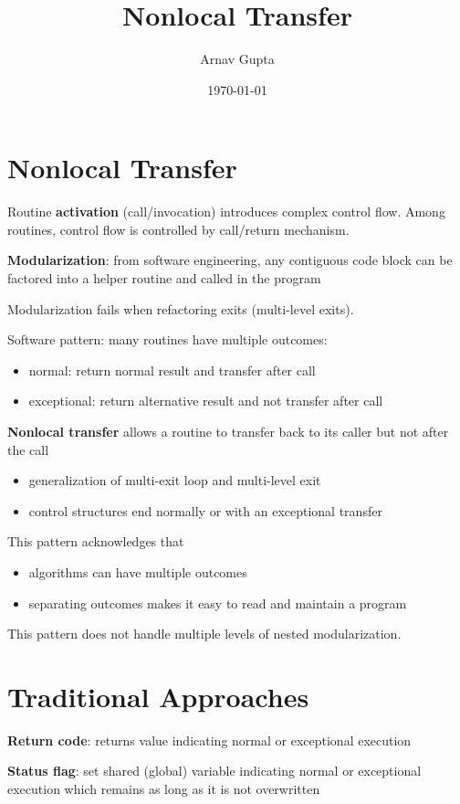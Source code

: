 \documentclass[11pt]{article}
\author{Arnav Gupta}
\date{\today}
\title{Nonlocal Transfer}
\begin{document}
\maketitle
\tableofcontents

\section{Nonlocal Transfer}
\label{sec:orgac91aa9}
Routine \textbf{activation} (call/invocation) introduces complex control flow.
Among routines, control flow is controlled by call/return mechanism.

\textbf{Modularization}: from software engineering, any contiguous code block can be factored into a helper
routine and called in the program

Modularization fails when refactoring exits (multi-level exits).

Software pattern: many routines have multiple outcomes:
\begin{itemize}
\item normal: return normal result and transfer after call
\item exceptional: return alternative result and not transfer after call
\end{itemize}

\textbf{Nonlocal transfer} allows a routine to transfer back to its caller but not after the call
\begin{itemize}
\item generalization of multi-exit loop and multi-level exit
\item control structures end normally or with an exceptional transfer
\end{itemize}

This pattern acknowledges that
\begin{itemize}
\item algorithms can have multiple outcomes
\item separating outcomes makes it easy to read and maintain a program
\end{itemize}

This pattern does not handle multiple levels of nested modularization.
\section{Traditional Approaches}
\label{sec:org8f7619b}
\textbf{Return code}: returns value indicating normal or exceptional execution

\textbf{Status flag}: set shared (global) variable indicating normal or exceptional execution which remains
as long as it is not overwritten
\end{document}
